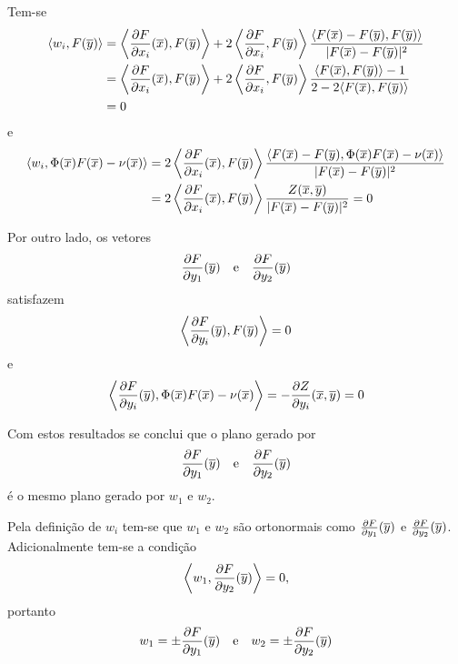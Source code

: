 \begin{demonstracao}
	Tem-se
	\begin{align*}
		\langle w_i, F(\overline{y}) \rangle &= \left\langle \frac{\partial F}{\partial x_i}(\overline{x}), F(\overline{y}) \right\rangle + 2 \left\langle \frac{\partial F}{\partial x_i}, F(\overline{y}) \right\rangle \frac{\langle F(\overline{x}) - F(\overline{y}),F(\overline{y}) \rangle}{| F(\overline{x}) - F(\overline{y}) |^2}\\
		&= \left\langle \frac{\partial F}{\partial x_i}(\overline{x}), F(\overline{y}) \right\rangle + 2 \left\langle \frac{\partial F}{\partial x_i}, F(\overline{y}) \right\rangle \frac{\langle F(\overline{x}),F(\overline{y}) \rangle - 1}{2 - 2 \langle F(\overline{x}), F(\overline{y}) \rangle}\\
		&= 0
	\end{align*}
	e
	\begin{align*}
		\langle w_i, \Phi(\overline{x}) F(\overline{x}) - \nu(\overline{x}) \rangle &= 2 \left\langle \frac{\partial F}{\partial x_i}(\overline{x}), F(\overline{y}) \right\rangle \frac{\langle F(\overline{x}) - F(\overline{y}), \Phi(\overline{x}) F(\overline{x}) - \nu(\overline{x}) \rangle}{| F(\overline{x}) - F(\overline{y}) |^2}\\
		&= 2 \left\langle \frac{\partial F}{\partial x_i}(\overline{x}), F(\overline{y}) \right\rangle \frac{Z(\overline{x},\overline{y})}{| F(\overline{x}) - F(\overline{y}) |^2} = 0
	\end{align*}
	
	Por outro lado, os vetores
	\begin{equation*}
		\frac{\partial F}{\partial y_1}(\overline{y}) \quad \text{e} \quad \frac{\partial F}{\partial y_2}(\overline{y})
	\end{equation*}
	satisfazem
	\begin{equation*}
		\left\langle \frac{\partial F}{\partial y_i}(\overline{y}), F(\overline{y}) \right\rangle = 0
	\end{equation*}
	e
	\begin{equation*}
		\left\langle \frac{\partial F}{\partial y_i}(\overline{y}), \Phi(\overline{x}) F(\overline{x}) - \nu(\overline{x}) \right\rangle = -\frac{\partial Z}{\partial y_i}(\overline{x},\overline{y}) = 0
	\end{equation*}
	
	Com estos resultados se conclui que o plano gerado por
	\begin{equation*}
		\frac{\partial F}{\partial y_1}(\overline{y}) \quad \text{e} \quad \frac{\partial F}{\partial y_2}(\overline{y})
	\end{equation*}
	é o mesmo plano gerado por $w_1$ e $w_2$.
	
	Pela definição de $w_i$ tem-se que $w_1$ e $w_2$ são ortonormais como $\frac{\partial F}{\partial y_1}(\overline{y})$ e $\frac{\partial F}{\partial y_2}(\overline{y})$. Adicionalmente tem-se a condição
	\begin{equation*}
		\left\langle w_1, \frac{\partial F}{\partial y_2}(\overline{y}) \right\rangle = 0,
	\end{equation*}
	portanto
	\begin{equation*}
		w_1 = \pm \frac{\partial F}{\partial y_1}(\overline{y}) \quad \text{e} \quad w_2 = \pm \frac{\partial F}{\partial y_2}(\overline{y})
	\end{equation*}
	

\end{demonstracao}
